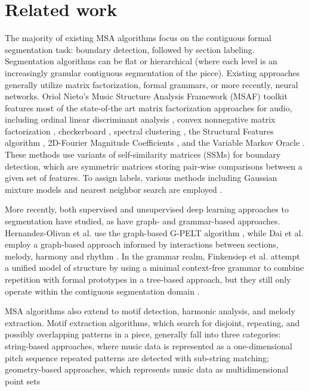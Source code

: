 \documentclass{article}
\begin{document}
\section{Related work}\label{sec:related_work}
The majority of existing MSA algorithms focus on the contiguous formal segmentation task: boundary detection, followed by section labeling. Segmentation algorithms can be flat or hierarchical (where each level is an increasingly granular contiguous segmentation of the piece). Existing approaches generally utilize matrix factorization, formal grammars, or more recently, neural networks. Oriol Nieto's Music Structure Analysis Framework (MSAF) toolkit \cite{msaf} features most of the state-of-the art matrix factorization approaches for audio, including ordinal linear discriminant analysis \cite{olda}, convex nonnegative matrix factorization \cite{cnmf}, checkerboard \cite{checkerboard}, spectral clustering \cite{scluster}, the Structural Features algorithm \cite{sf}, 2D-Fourier Magnitude Coefficients \cite{2dfmc}, and the Variable Markov Oracle \cite{vmo_segmentation}. These methods use variants of self-similarity matrices (SSMs) for boundary detection, which are symmetric matrices storing pair-wise comparisons between a given set of features. To assign labels, various methods including Gaussian mixture models and nearest neighbor search are employed \cite{msaf}. 

More recently, both supervised \cite{wang_2021} and unsupervised \cite{mccallum_2021, buisson_2022} deep learning approaches to segmentation have studied, as have graph- and grammar-based approaches. Hernandez-Olivan et al. use the graph-based G-PELT algorithm \cite{musicaiz}, while Dai et al. employ a graph-based approach informed by interactions between sections, melody, harmony and rhythm \cite{cmu_dannenberg_2020}. In the grammar realm, Finkensiep et al. attempt a unified model of structure by using a minimal context-free grammar to combine repetition with formal prototypes in a tree-based approach, but they still only operate within the contiguous segmentation domain \cite{repetition_grammars_ismir2023}. 

MSA algorithms also extend to motif detection, harmonic analysis, and melody extraction. Motif extraction algorithms, which search for disjoint, repeating, and possibly overlapping patterns in a piece, generally fall into three categories: string-based approaches, where music data is represented as a one-dimensional pitch sequence repeated patterns are detected with sub-string matching; geometry-based approaches, which represents music data as multidimensional point sets
\end{document}

